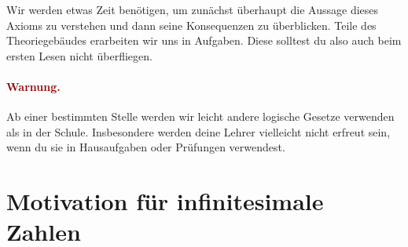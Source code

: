 \documentclass{zirkelblatt}
\theoremstyle{definition}
\theoremstyle{plain}
\theoremstyle{remark}
\begin{document}
Wir werden etwas Zeit benötigen, um zunächst überhaupt die Aussage dieses Axioms zu
verstehen und dann seine Konsequenzen zu überblicken. Teile des Theoriegebäudes
erarbeiten wir uns in Aufgaben. Diese solltest du also auch beim ersten Lesen
nicht überfliegen.

\paragraph{\textcolor{darkred}{Warnung.}} Ab einer bestimmten Stelle werden wir
leicht andere logische Gesetze verwenden als in der Schule. Insbesondere werden
deine Lehrer vielleicht nicht erfreut sein, wenn du sie in Hausaufgaben oder
Prüfungen verwendest.

\section{Motivation für infinitesimale Zahlen}
\end{document}
